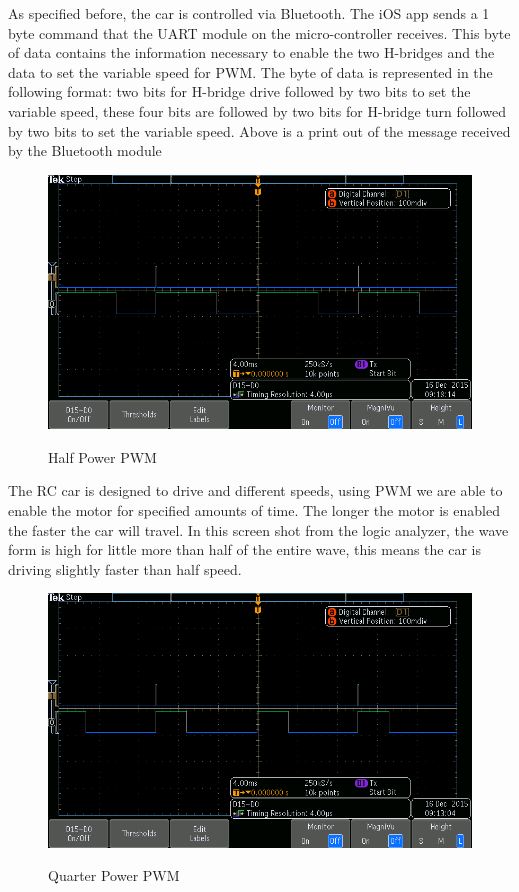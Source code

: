 \documentclass[12pt]{article}
\begin{document}
As specified before, the car is controlled via Bluetooth. The iOS app sends a 1 byte command that the UART module on the micro-controller receives. This byte of data contains the information necessary to enable the two H-bridges and the data to set the variable speed for PWM. The byte of data is represented in the following format: two bits for H-bridge drive followed by two bits to set the variable speed, these four bits are followed by two bits for H-bridge turn followed by two bits to set the variable speed. Above is a print out of the message received by the Bluetooth module \\


\begin{figure}[H]
\begin {center}
\includegraphics[scale=.75]{half-power}\\
\caption{Half Power PWM}
\end {center}
\end{figure}

The RC car is designed to drive and different speeds, using PWM we are able to enable the motor for specified amounts of  time. The longer the motor is enabled the faster the car will travel. In this screen shot from the logic analyzer, the wave form is high for little more than half of the entire wave, this means the car is driving slightly faster than half speed.\\


\begin{figure}[H]
\begin {center}
\includegraphics[scale=.75]{quarter-power}\\
\caption{Quarter Power PWM}
\end {center}
\end{figure}
\end{document}
